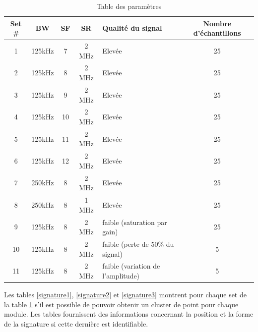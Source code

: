 \begin{table}[h]
\centering
\begin{tabular}{|c|c|c|c|p{3cm}|c|}
\hline
Set \# & BW & SF & SR & Qualité du signal & Nombre d'échantillons\\
\hline
1  & 125kHz & 7 & 2 MHz & Elevée & 25\\
\hline
2  & 125kHz & 8 & 2 MHz & Elevée & 25\\
\hline
3  & 125kHz & 9 & 2 MHz & Elevée & 25\\
\hline
4  & 125kHz & 10 & 2 MHz & Elevée & 25\\
\hline
5  & 125kHz & 11 & 2 MHz & Elevée & 25\\
\hline
6  & 125kHz & 12 & 2 MHz & Elevée & 25\\
\hline
7  & 250kHz & 8 & 2 MHz & Elevée & 25\\
\hline
8  & 250kHz & 8 & 1 MHz & Elevée & 25\\
\hline
9  &  125kHz & 8 & 2 MHz & faible (saturation par gain) & 25\\
\hline
10  & 125kHz & 8 & 2 MHz & faible (perte de 50\% du signal) & 5\\
\hline
11  & 125kHz & 8 & 2 MHz & faible (variation de l'amplitude) & 5\\
\hline
\end{tabular}
\caption{Table des paramètres}
\label{set}
\end{table}

Les tables \ref{signature1}, \ref{signature2} et \ref{signature3} montrent pour chaque set de la table \ref{set} s'il est possible de pouvoir obtenir un cluster de point pour chaque module. Les tables fournissent des informations concernant la position et la forme de la signature si cette dernière est identifiable.

\newpage

